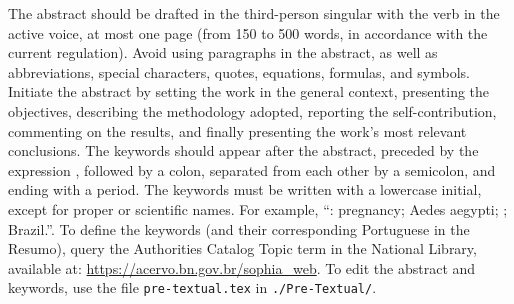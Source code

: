 \begin{Abstract}%
[english]%
The abstract should be drafted in the third-person singular with the verb in the active voice, at most one page (from 150 to 500 words, in accordance with the current regulation).
Avoid using paragraphs in the abstract, as well as abbreviations, special characters, quotes, equations, formulas, and symbols.
Initiate the abstract by setting the work in the general context, presenting the objectives, describing the methodology adopted, reporting the self-contribution, commenting on the results, and finally presenting the work's most relevant conclusions.
The keywords should appear after the abstract, preceded by the expression \KeywordsCall, followed by a colon, separated from each other by a semicolon, and ending with a period.
The keywords must be written with a lowercase initial, except for proper or scientific names.
For example, \enquote{\KeywordsCall: pregnancy; Aedes aegypti; ; Brazil.}.
To define the keywords (and their corresponding Portuguese in the Resumo), query the Authorities Catalog Topic term in the National Library, available at: \url{https://acervo.bn.gov.br/sophia_web}.
To edit the abstract and keywords, use the file \texttt{pre-textual.tex} in \texttt{./Pre-Textual/}.
\end{Abstract}
